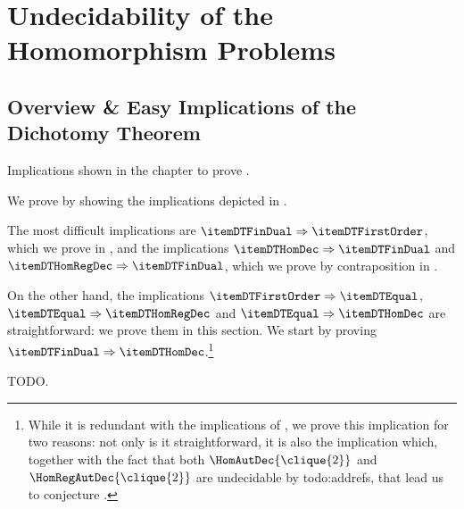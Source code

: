 \section{\AP\label{sec:dichotomy-undecidability}%
	Undecidability of the Homomorphism Problems}

\subsection{\AP\label{sec:dichotomy-overview}%
Overview \& Easy Implications of the Dichotomy Theorem}

\begin{marginfigure}
	\centering
	\begin{tikzpicture}
		
	\end{tikzpicture}
	\caption{\AP\label{fig:dichotomy-overview}Implications shown in the chapter to prove
	.}
\end{marginfigure}
We prove  by showing the
implications depicted in .

The most difficult implications are $\itemDTFinDual \Rightarrow \itemDTFirstOrder$,
which we prove in , and the implications
$\itemDTHomDec \Rightarrow \itemDTFinDual$ and $\itemDTHomRegDec \Rightarrow \itemDTFinDual$,
which we prove by contraposition in .

On the other hand, the implications $\itemDTFirstOrder \Rightarrow \itemDTEqual$,
$\itemDTEqual \Rightarrow \itemDTHomRegDec$ and $\itemDTEqual \Rightarrow \itemDTHomDec$ are straightforward: we prove them in this section. 
We start by proving $\itemDTFinDual \Rightarrow \itemDTHomDec$.\footnote{While it is redundant with the implications of , 
we prove this implication for two reasons: not only is it straightforward, it is also
the implication which, together with the fact that both $\HomAutDec{\clique{2}}$
and $\HomRegAutDec{\clique{2}}$ are undecidable by todo:addrefs, that lead us to conjecture
.}


TODO.

